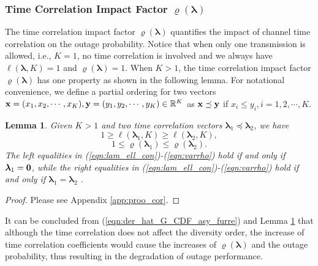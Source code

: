 \documentclass[12pt,onecolumn,draftcls]{IEEEtran}
\newcommand{\bs}{\boldsymbol}
\newtheorem{lemma}{Lemma}
\begin{document}
\subsubsection{Time Correlation Impact Factor $\varrho(\bs \lambda)$}
The time correlation impact factor $\varrho(\bs \lambda)$ quantifies the impact of channel time correlation on the outage probability. Notice that when only one transmission is allowed, i.e., $K=1$, no time correlation is involved and we always have $\ell \left( {{\bs{\lambda }},K} \right)=1$ and $\varrho(\bs \lambda)=1$. When $K>1$, the time correlation impact factor $\varrho(\bs \lambda)$ has one property as shown in the following lemma. For notational convenience, we define a partial ordering for two vectors ${\bf x}= (x_1, x_2, \cdots, x_K), {\bf y}= (y_1, y_2, \cdots, y_K) \in \mathbb{R}^K$ as ${\bf x} \preceq \bf y$ if $x_i \le y_i, i = 1,2,\cdots,K$.
%
%
\begin{lemma}\label{cor:time_corr}
Given $K>1$ and two time correlation vectors $\bs{\lambda}_1 \preceq \bs{\lambda}_2$, we have
\begin{equation}\label{eqn:lam_ell_con}
1 \ge \ell \left( {{\bs{\lambda }_1},K} \right) \ge \ell \left( {{\bs{\lambda }_2},K} \right),
\end{equation}
\begin{equation} \label{eqn:varrho}
1 \le \varrho(\bs \lambda_1) \le \varrho(\bs \lambda_2).
\end{equation}
The left equalities in (\ref{eqn:lam_ell_con})-(\ref{eqn:varrho}) hold if and only if $\bs \lambda_1 = \bf 0$, while the right equalities in (\ref{eqn:lam_ell_con})-(\ref{eqn:varrho}) hold if and only if $\bs \lambda_1 = \bs \lambda_2$ .
\end{lemma}
\begin{proof}
Please see Appendix \ref{app:proo_cor}.
\end{proof}

It can be concluded from (\ref{eqn:der_hat_G_CDF_asy_furre}) and Lemma \ref{cor:time_corr} that although the time correlation does not affect the diversity order, the increase of time correlation coefficients would cause the increases of $\varrho(\bs \lambda)$ and the outage probability, thus resulting in the degradation of outage performance.
%
\end{document}
